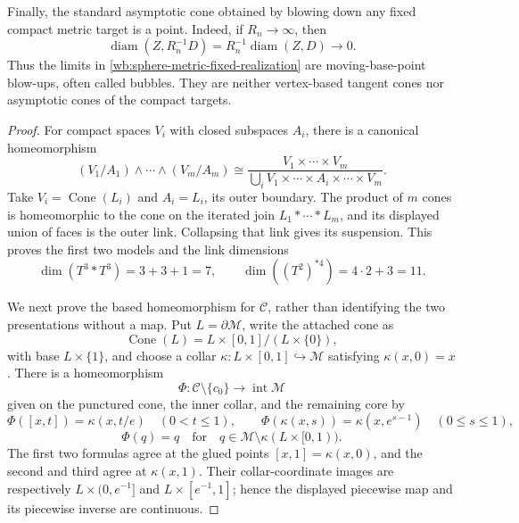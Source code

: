 \begin{proposition}
Finally, the standard asymptotic cone obtained by blowing down any fixed
compact metric target is a point.  Indeed, if \(R_n\to\infty\), then
\[
 \operatorname{diam}(Z,R_n^{-1}D)
 =R_n^{-1}\operatorname{diam}(Z,D)\longrightarrow0.
\]
Thus the limits in \cref{wb:sphere-metric-fixed-realization} are
moving-base-point blow-ups, often called bubbles.  They are neither
vertex-based tangent cones nor asymptotic cones of the compact targets.
\end{proposition}

\begin{proof}
For compact spaces \(V_i\) with closed subspaces \(A_i\), there is a
canonical homeomorphism
\[
 (V_1/A_1)\wedge\cdots\wedge(V_m/A_m)
 \cong
 \frac{V_1\times\cdots\times V_m}
      {\bigcup_iV_1\times\cdots\times A_i\times\cdots\times V_m}.
\]
Take \(V_i=\operatorname{Cone}(L_i)\) and \(A_i=L_i\), its outer boundary.
The product of \(m\) cones is homeomorphic to the cone on the iterated join
\(L_1*\cdots*L_m\), and its displayed union of faces is the outer link.
Collapsing that link gives its suspension.  This proves the first two
models and the link dimensions
\[
 \dim(T^3*T^3)=3+3+1=7,
 \qquad
 \dim((T^2)^{*4})=4\cdot2+3=11.
\]

We next prove the based homeomorphism for \(\mathcal C\), rather than
identifying the two presentations without a map.  Put
\(L=\partial\mathcal M\), write the attached cone as
\[
 \operatorname{Cone}(L)
 =L\times[0,1]/(L\times\{0\}),
\]
with base \(L\times\{1\}\), and choose a collar
\(\kappa:L\times[0,1]\hookrightarrow\mathcal M\) satisfying
\(\kappa(x,0)=x\).  There is a homeomorphism
\[
 \Phi:\mathcal C\setminus\{c_0\}
       \longrightarrow\operatorname{int}\mathcal M
\]
given on the punctured cone, the inner collar, and the remaining core by
\[
 \Phi([x,t])=\kappa(x,t/e)\quad(0<t\leq1),\qquad
 \Phi(\kappa(x,s))=\kappa(x,e^{s-1})\quad(0\leq s\leq1),
\]
\[
 \Phi(q)=q
 \quad\text{for}\quad
 q\in\mathcal M\setminus\kappa(L\times[0,1)).
\]
The first two formulas agree at the glued points
\([x,1]=\kappa(x,0)\), and the second and third agree at
\(\kappa(x,1)\).  Their collar-coordinate images are respectively
\(L\times(0,e^{-1}]\) and \(L\times[e^{-1},1]\); hence the displayed
piecewise map and its piecewise inverse are continuous.


\end{proof}
